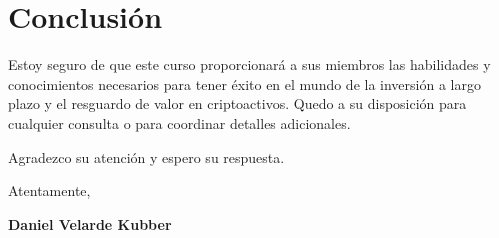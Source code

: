 \documentclass[a4paper,12pt]{article}
\begin{document}
\vspace{1em}

\section*{Conclusión}

Estoy seguro de que este curso proporcionará a sus miembros las habilidades y conocimientos necesarios para tener éxito en el mundo de la inversión a largo plazo y el resguardo de valor en criptoactivos. Quedo a su disposición para cualquier consulta o para coordinar detalles adicionales.

Agradezco su atención y espero su respuesta.

Atentamente,

\vspace{2em}

\textbf{Daniel Velarde Kubber}
\end{document}
